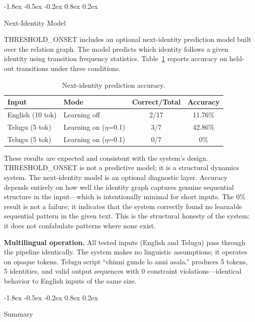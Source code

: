 \documentclass[10pt]{article}
\makeatletter
\renewcommand{\subsection}{\@startsection{subsection}{2}{\z@}%
  {-1.8ex \@plus -0.5ex \@minus -0.2ex}%
  {0.8ex \@plus 0.2ex}%
  {\normalsize\bfseries\raggedright}}
\makeatother
\begin{document}
\subsection{Next-Identity Model}

THRESHOLD\_ONSET includes an optional next-identity prediction model built over the
relation graph. The model predicts which identity follows a given identity using
transition frequency statistics. Table~\ref{tab:model} reports accuracy on held-out
transitions under three conditions.

\begin{table}[t]
\centering
\caption{Next-identity prediction accuracy.}
\label{tab:model}
\begin{tabular}{llcc}
\toprule
\textbf{Input} & \textbf{Mode} & \textbf{Correct/Total} & \textbf{Accuracy} \\
\midrule
English (10 tok) & Learning off & 2/17 & 11.76\% \\
Telugu (5 tok) & Learning on ($\eta$=0.1) & 3/7 & 42.86\% \\
Telugu (5 tok) & Learning on ($\eta$=0.1) & 0/7 & 0\% \\
\bottomrule
\end{tabular}
\end{table}

These results are expected and consistent with the system's design. THRESHOLD\_ONSET is
not a predictive model; it is a structural dynamics system. The next-identity model is
an optional diagnostic layer. Accuracy depends entirely on how well the identity graph
captures genuine sequential structure in the input---which is intentionally minimal for
short inputs. The 0\% result is not a failure; it indicates that the system correctly
found no learnable sequential pattern in the given text. This is the structural
honesty of the system: it does not confabulate patterns where none exist.

\textbf{Multilingual operation.}
All tested inputs (English and Telugu) pass through the pipeline identically. The
system makes no linguistic assumptions; it operates on opaque tokens. Telugu script
``chinni gunde lo anni asala.'' produces 5 tokens, 5 identities, and valid output
sequences with 0 constraint violations---identical behavior to English inputs of
the same size.

\subsection{Summary}
\end{document}
